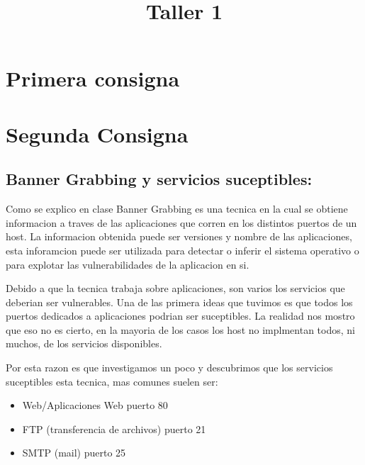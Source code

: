 \documentclass[a4paper]{article}
\title{Taller 1}
\begin{document}


\maketitle

\newpage




\newpage


\section{Primera consigna}


\newpage
\section{Segunda Consigna}

\subsection{Banner Grabbing y servicios suceptibles:}
Como se explico en clase  Banner Grabbing es una tecnica en la cual se obtiene informacion a traves de las aplicaciones que corren en los distintos puertos de un host. La informacion obtenida puede ser
versiones y nombre de las aplicaciones, esta inforamcion puede ser utilizada para detectar o inferir el sistema operativo o para explotar las vulnerabilidades de la aplicacion en si.

Debido a que la tecnica trabaja sobre aplicaciones, son varios los servicios que deberian ser vulnerables. Una de las primera ideas que tuvimos es que todos los puertos dedicados a aplicaciones
podrian ser suceptibles. La realidad nos mostro que eso no es cierto, en la mayoria de los casos los host no implmentan todos, ni muchos, de los servicios disponibles. 

Por esta razon es que investigamos un poco y descubrimos que  los servicios suceptibles esta tecnica, mas comunes suelen ser:
\begin{itemize}
\item Web/Aplicaciones Web puerto 80
\item FTP (transferencia de archivos) puerto 21
\item SMTP (mail) puerto 25
\end{itemize}
\end{document}
